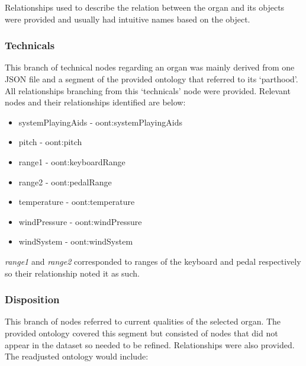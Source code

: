Relationships used to describe the relation between the organ and its objects were provided and usually had intuitive names based on the object. 

\subsubsection{Technicals}
\hspace*{0.5cm} This branch of technical nodes regarding an organ was mainly derived from one JSON file and a segment of the provided ontology that referred to its `parthood'. All relationships branching from this `technicals' node were provided. Relevant nodes and their relationships identified are below:

\vspace{-0.1cm}
\begin{itemize}
    \itemsep0em 
    \item systemPlayingAids - oont:systemPlayingAids
    \vspace{-0.05cm}
    \item pitch - oont:pitch
    \vspace{-0.05cm}
    \item range1 -  oont:keyboardRange
    \vspace{-0.05cm}
    \item range2 - oont:pedalRange
    \vspace{-0.05cm}
    \item temperature - oont:temperature
    \vspace{-0.05cm}
    \item windPressure - oont:windPressure
    \vspace{-0.05cm}
    \item windSystem - oont:windSystem
\end{itemize}

\textit{range1} and \textit{range2} corresponded to ranges of the keyboard and pedal respectively so their relationship noted it as such. 

\subsubsection{Disposition}
\hspace*{0.5cm} This branch of nodes referred to current qualities of the selected organ. The provided ontology covered this segment but consisted of nodes that did not appear in the dataset so needed to be refined. Relationships were also provided. The readjusted ontology would include:


